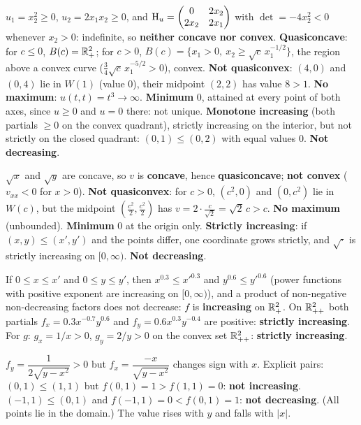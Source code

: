 \begin{solutions}
  \item $u_1=x_2^{2}\ge0$, $u_2=2x_1x_2\ge0$, and
        $\operatorname{H}_u=\begin{pmatrix}0&2x_2\\2x_2&2x_1\end{pmatrix}$ with
        $\det=-4x_2^{2}<0$ whenever $x_2>0$: indefinite, so \textbf{neither
        concave nor convex}. \textbf{Quasiconcave}: for $c\le0$,
        $B(c)=\mathbb{R}^{2}_{+}$; for $c>0$,
        $B(c)=\{x_1>0,\ x_2\ge\sqrt{c}\,x_1^{-1/2}\}$, the region above a
        convex curve ($\tfrac34\sqrt c\,x_1^{-5/2}>0$), convex.
        \textbf{Not quasiconvex}: $(4,0)$ and $(0,4)$ lie in $W(1)$ (value
        $0$), their midpoint $(2,2)$ has value $8>1$. \textbf{No maximum}:
        $u(t,t)=t^{3}\to\infty$. \textbf{Minimum} $0$, attained at every
        point of both axes, since $u\ge0$ and $u=0$ there: not unique.
        \textbf{Monotone increasing} (both partials $\ge0$ on the convex
        quadrant), strictly increasing on the interior, but not strictly on
        the closed quadrant: $(0,1)\le(0,2)$ with equal values $0$.
        \textbf{Not decreasing}.

  \item $\sqrt{x}$ and $\sqrt{y}$ are concave, so $v$ is \textbf{concave},
        hence \textbf{quasiconcave}; \textbf{not convex} ($v_{xx}<0$ for
        $x>0$). \textbf{Not quasiconvex}: for $c>0$, $(c^{2},0)$ and
        $(0,c^{2})$ lie in $W(c)$, but the midpoint
        $(\tfrac{c^{2}}2,\tfrac{c^{2}}2)$ has
        $v=2\cdot\tfrac{c}{\sqrt2}=\sqrt2\,c>c$. \textbf{No maximum}
        (unbounded). \textbf{Minimum} $0$ at the origin only.
        \textbf{Strictly increasing}: if $(x,y)\le(x',y')$ and the points
        differ, one coordinate grows strictly, and $\sqrt{\cdot}$ is
        strictly increasing on $[0,\infty)$. \textbf{Not decreasing}.

  \item If $0\le x\le x'$ and $0\le y\le y'$, then $x^{0.3}\le x'^{0.3}$
        and $y^{0.6}\le y'^{0.6}$ (power functions with positive exponent
        are increasing on $[0,\infty)$), and a product of non-negative
        non-decreasing factors does not decrease: $f$ is
        \textbf{increasing} on $\mathbb{R}^{2}_{+}$. On $\mathbb{R}^{2}_{++}$ both partials
        $f_x=0.3x^{-0.7}y^{0.6}$ and $f_y=0.6x^{0.3}y^{-0.4}$ are positive:
        \textbf{strictly increasing}. For $g$: $g_x=1/x>0$, $g_y=2/y>0$ on
        the convex set $\mathbb{R}^{2}_{++}$: \textbf{strictly increasing}.

  \item $f_y=\dfrac{1}{2\sqrt{y-x^{2}}}>0$ but
        $f_x=\dfrac{-x}{\sqrt{y-x^{2}}}$ changes sign with $x$. Explicit
        pairs: $(0,1)\le(1,1)$ but $f(0,1)=1>f(1,1)=0$: \textbf{not
        increasing}. $(-1,1)\le(0,1)$ and $f(-1,1)=0<f(0,1)=1$:
        \textbf{not decreasing}. (All points lie in the domain.) The value
        rises with $y$ and falls with $|x|$.


\end{solutions}
